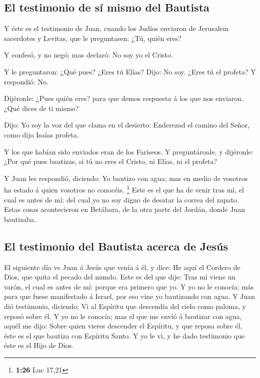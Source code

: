 \hypertarget{el-testimonio-de-suxed-mismo-del-bautista}{%
\subsection{El testimonio de sí mismo del
Bautista}\label{el-testimonio-de-suxed-mismo-del-bautista}}

 Y éste es el testimonio de Juan, cuando los Judíos
enviaron de Jerusalem sacerdotes y Levitas, que le preguntasen: ¿Tú,
quién eres?

 Y confesó, y no negó; mas declaró: No soy yo el Cristo.

 Y le preguntaron: ¿Qué pues? ¿Eres tú Elías? Dijo: No
soy. ¿Eres tú el profeta? Y respondió: No.~

 Dijéronle: ¿Pues quién eres? para que demos respuesta á
los que nos enviaron. ¿Qué dices de ti mismo?

 Dijo: Yo soy la voz del que clama en el desierto:
Enderezad el camino del Señor, como dijo Isaías profeta.

 Y los que habían sido enviados eran de los Fariseos.
 Y preguntáronle, y dijéronle: ¿Por qué pues bautizas, si
tú no eres el Cristo, ni Elías, ni el profeta?

 Y Juan les respondió, diciendo: Yo bautizo con agua; mas
en medio de vosotros ha estado á quien vosotros no conocéis. \footnote{\textbf{1:26}
  Luc 17,21}  Este es el que ha de venir tras mí, el cual
es antes de mí: del cual yo no soy digno de desatar la correa del
zapato.  Estas cosas acontecieron en Betábara, de la otra
parte del Jordán, donde Juan bautizaba.

\hypertarget{el-testimonio-del-bautista-acerca-de-jesuxfas}{%
\subsection{El testimonio del Bautista acerca de
Jesús}\label{el-testimonio-del-bautista-acerca-de-jesuxfas}}

 El siguiente día ve Juan á Jesús que venía á él, y dice:
He aquí el Cordero de Dios, que quita el pecado del mundo.
 Este es del que dije: Tras mí viene un varón, el cual es
antes de mí: porque era primero que yo.  Y yo no le
conocía; más para que fuese manifestado á Israel, por eso vine yo
bautizando con agua.  Y Juan dió testimonio, diciendo: Vi
al Espíritu que descendía del cielo como paloma, y reposó sobre él.
 Y yo no le conocía; mas el que me envió á bautizar con
agua, aquél me dijo: Sobre quien vieres descender el Espíritu, y que
reposa sobre él, éste es el que bautiza con Espíritu Santo.
 Y yo le vi, y he dado testimonio que éste es el Hijo de
Dios.

